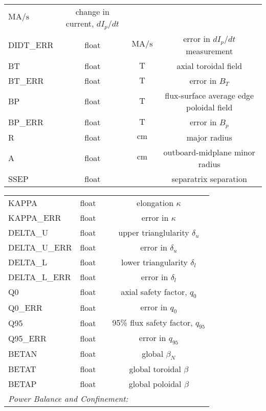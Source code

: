 \begin{table*}[h]
{\begin{tabular}{lccc}
   $\si{\mega\ampere\per\second}$ &
   change in current, $dI_p/dt$
   \\
   DIDT\_ERR &
   float &
   $\si{\mega\ampere\per\second}$ &
   error in $dI_p/dt$ measurement
   \\
   BT &
   float &
   $\si{\tesla}$ &
   axial toroidal field
   \\
   BT\_ERR &
   float &
   $\si{\tesla}$ &
   error in $B_T$
   \\
   BP &
   float &
   $\si{\tesla}$ &
   flux-surface average edge poloidal field
   \\
   BP\_ERR &
   float &
   $\si{\tesla}$ &
   error in $B_p$
   \\
   R &
   float &
   $\si{\centi\meter}$ &
   major radius
   \\
   A &
   float &
   $\si{\centi\meter}$ &
   outboard-midplane minor radius
   \\
   SSEP &
   float &
   \note{?} &
   separatrix separation\note{?}
   \\
   \end{tabular}}
 \end{table*}
 \begin{table*}[h]
  \ContinuedFloat
  \pushtooutside
  \begin{tabular}{lccc}
   KAPPA &
   float &
   &
   elongation $\kappa$
   \\
   KAPPA\_ERR &
   float &
   &
   error in $\kappa$
   \\
   DELTA\_U &
   float &
   &
   upper trianglularity $\delta_u$
   \\
   DELTA\_U\_ERR &
   float &
   &
   error in $\delta_u$
   \\
   DELTA\_L &
   float &
   &
   lower triangularity $\delta_l$
   \\
   DELTA\_L\_ERR &
   float &
   &
   error in $\delta_l$
   \\
   Q0 &
   float &
   &
   axial safety factor, $q_0$
   \\
   Q0\_ERR &
   float &
   &
   error in $q_0$
   \\
   Q95 &
   float &
   &
   95\% flux safety factor, $q_{95}$
   \\
   Q95\_ERR &
   float &
   &
   error in $q_{95}$
   \\
   BETAN &
   float &
   &
   global $\beta_{N}$
   \\
   BETAT &
   float &
   &
   global toroidal $\beta$
   \\
   BETAP &
   float &
   &
   global poloidal $\beta$
   \\
   \midrule
   \multicolumn{4}{l}{\emph{Power Balance and Confinement:}}
   \\
   \midrule
   \bottomrule
  \end{tabular}
 \end{table*}

\nicechapterending